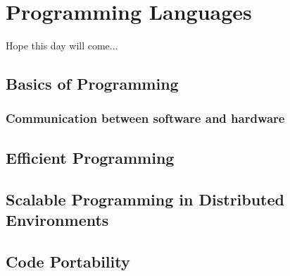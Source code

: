 \chapter{Programming Languages} \label{chap-programming}
Hope this day will come...
\section{Basics of Programming}
\subsection{Communication between software and hardware}
\section{Efficient Programming}
\section{Scalable Programming in Distributed Environments}
\section{Code Portability}

